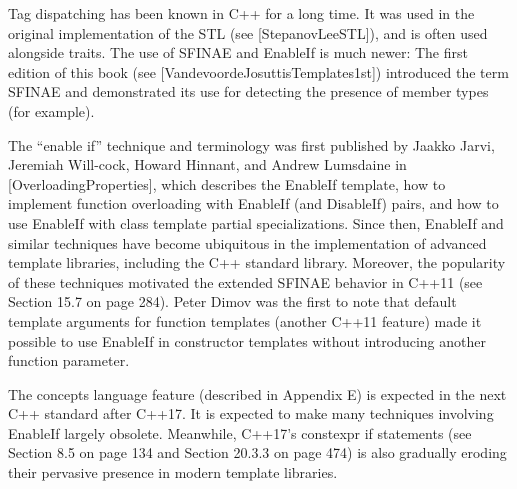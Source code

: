 Tag dispatching has been known in C++ for a long time. It was used in the original implementation of the STL (see [StepanovLeeSTL]), and is often used alongside traits. The use of SFINAE and EnableIf is much newer: The first edition of this book (see [VandevoordeJosuttisTemplates1st]) introduced the term SFINAE and demonstrated its use for detecting the presence of member types (for example).

The “enable if” technique and terminology was first published by Jaakko Jarvi, Jeremiah Will-cock, Howard Hinnant, and Andrew Lumsdaine in [OverloadingProperties], which describes the EnableIf template, how to implement function overloading with EnableIf (and DisableIf) pairs, and how to use EnableIf with class template partial specializations. Since then, EnableIf and  similar techniques have become ubiquitous in the implementation of advanced template libraries, including the C++ standard library. Moreover, the popularity of these techniques motivated the extended SFINAE behavior in C++11 (see Section 15.7 on page 284). Peter Dimov was the first to note that default template arguments for function templates (another C++11 feature) made it possible to use EnableIf in constructor templates without introducing another function parameter.

The concepts language feature (described in Appendix E) is expected in the next C++ standard after C++17. It is expected to make many techniques involving EnableIf largely obsolete. Meanwhile, C++17’s constexpr if statements (see Section 8.5 on page 134 and Section 20.3.3 on page 474) is also gradually eroding their pervasive presence in modern template libraries.